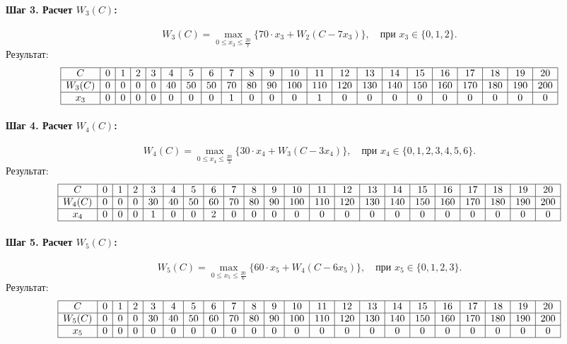 \documentclass{article}
\begin{document}
\paragraph*{Шаг 3. Расчет $W_3(C)$:}
\[
    W_3(C) = \max_{0 \leq x_3 \leq \frac{20}{7}} \{ 70 \cdot x_3 + W_2(C - 7 x_3) \}, \quad \text{при } x_3 \in \{0, 1, 2\}.
\]
Результат:
\[
    \begin{array}{|c|c|c|c|c|c|c|c|c|c|c|c|c|c|c|c|c|c|c|c|c|c|}
        \hline
        C      & 0 & 1 & 2 & 3 & 4  & 5  & 6  & 7  & 8  & 9  & 10  & 11  & 12  & 13  & 14  & 15  & 16  & 17  & 18  & 19  & 20  \\
        \hline
        W_3(C) & 0 & 0 & 0 & 0 & 40 & 50 & 50 & 70 & 80 & 90 & 100 & 110 & 120 & 130 & 140 & 150 & 160 & 170 & 180 & 190 & 200 \\
        \hline
        x_3    & 0 & 0 & 0 & 0 & 0  & 0  & 0  & 1  & 0  & 0  & 0   & 1   & 0   & 0   & 0   & 0   & 0   & 0   & 0   & 0   & 0   \\
        \hline
    \end{array}
\]

\paragraph*{Шаг 4. Расчет $W_4(C)$:}
\[
    W_4(C) = \max_{0 \leq x_4 \leq \frac{20}{3}} \{ 30 \cdot x_4 + W_3(C - 3 x_4) \}, \quad \text{при } x_4 \in \{0, 1, 2, 3, 4, 5, 6\}.
\]
Результат:
\[
    \begin{array}{|c|c|c|c|c|c|c|c|c|c|c|c|c|c|c|c|c|c|c|c|c|c|}
        \hline
        C      & 0 & 1 & 2 & 3  & 4  & 5  & 6  & 7  & 8  & 9  & 10  & 11  & 12  & 13  & 14  & 15  & 16  & 17  & 18  & 19  & 20  \\
        \hline
        W_4(C) & 0 & 0 & 0 & 30 & 40 & 50 & 60 & 70 & 80 & 90 & 100 & 110 & 120 & 130 & 140 & 150 & 160 & 170 & 180 & 190 & 200 \\
        \hline
        x_4    & 0 & 0 & 0 & 1  & 0  & 0  & 2  & 0  & 0  & 0  & 0   & 0   & 0   & 0   & 0   & 0   & 0   & 0   & 0   & 0   & 0   \\
        \hline
    \end{array}
\]

\paragraph*{Шаг 5. Расчет $W_5(C)$:}
\[
    W_5(C) = \max_{0 \leq x_5 \leq \frac{20}{6}} \{ 60 \cdot x_5 + W_4(C - 6 x_5) \}, \quad \text{при } x_5 \in \{0, 1, 2, 3\}.
\]
Результат:
\[
    \begin{array}{|c|c|c|c|c|c|c|c|c|c|c|c|c|c|c|c|c|c|c|c|c|c|}
        \hline
        C      & 0 & 1 & 2 & 3  & 4  & 5  & 6  & 7  & 8  & 9  & 10  & 11  & 12  & 13  & 14  & 15  & 16  & 17  & 18  & 19  & 20  \\
        \hline
        W_5(C) & 0 & 0 & 0 & 30 & 40 & 50 & 60 & 70 & 80 & 90 & 100 & 110 & 120 & 130 & 140 & 150 & 160 & 170 & 180 & 190 & 200 \\
        \hline
        x_5    & 0 & 0 & 0 & 0  & 0  & 0  & 0  & 0  & 0  & 0  & 0   & 0   & 0   & 0   & 0   & 0   & 0   & 0   & 0   & 0   & 0   \\
        \hline
    \end{array}
\]
\end{document}
